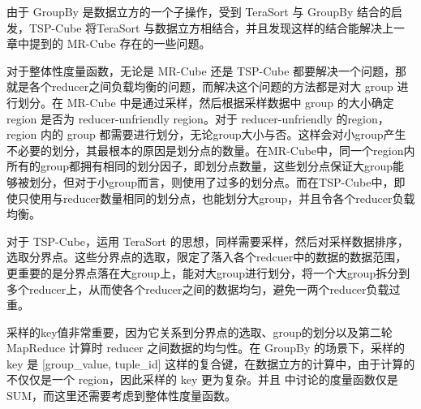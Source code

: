 由于 GroupBy 是数据立方的一个子操作，受到 TeraSort 与 GroupBy 结合的启发，TSP-Cube 将TeraSort 与数据立方相结合，并且发现这样的结合能解决上一章中提到的 MR-Cube 存在的一些问题。





对于整体性度量函数，无论是 MR-Cube 还是 TSP-Cube 都要解决一个问题，那就是各个reducer之间负载均衡的问题，而解决这个问题的方法都是对大 group 进行划分。在 MR-Cube 中是通过采样，然后根据采样数据中 group 的大小确定 region 是否为 reducer-unfriendly region。对于 reducer-unfriendly 的region，region 内的 group 都需要进行划分，无论group大小与否。这样会对小group产生不必要的划分，其最根本的原因是划分点的数量。在MR-Cube中，同一个region内所有的group都拥有相同的划分因子，即划分点数量，这些划分点保证大group能够被划分，但对于小group而言，则使用了过多的划分点。而在TSP-Cube中，即使只使用与reducer数量相同的划分点，也能划分大group，并且令各个reducer负载均衡。

对于 TSP-Cube，运用 TeraSort 的思想，同样需要采样，然后对采样数据排序，选取分界点。这些分界点的选取，限定了落入各个redcuer中的数据的数据范围，更重要的是分界点落在大group上，能对大group进行划分，将一个大group拆分到多个reducer上，从而使各个reducer之间的数据均匀，避免一两个reducer负载过重。

采样的key值非常重要，因为它关系到分界点的选取、group的划分以及第二轮 MapReduce 计算时 reducer 之间数据的均匀性。在 GroupBy 的场景下，采样的 key 是 [group\_value, tuple\_id] 这样的复合键，在数据立方的计算中，由于计算的不仅仅是一个 region，因此采样的 key 更为复杂。并且\cite{tao2013minimal} 中讨论的度量函数仅是 SUM，而这里还需要考虑到整体性度量函数。

